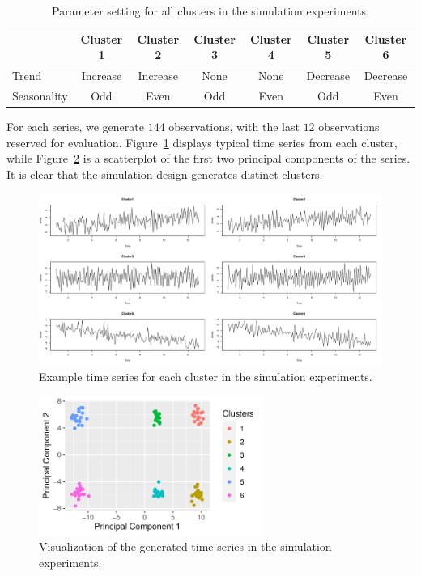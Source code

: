 \documentclass[a4paper,review,12pt,authoryear]{elsarticle}
\begin{document}
\begin{table}[h!]
\caption{\label{table:simu_params}Parameter setting for all clusters in the simulation experiments.}
\centering
\begin{tabular}{lcccccc}\toprule
& Cluster 1 & Cluster 2 & Cluster 3 & Cluster 4 & Cluster 5 & Cluster 6 \\ \midrule
Trend & Increase & Increase & None & None & Decrease & Decrease \\
Seasonality & Odd & Even & Odd & Even & Odd & Even  \\
    \bottomrule
\end{tabular}
\end{table}

For each series, we generate $144$ observations, with the last $12$ observations reserved for evaluation. Figure~\ref{fig:simu_emps} displays typical time series from each cluster, while Figure~\ref{fig:simu_pca} is a scatterplot of the first two principal components of the series. It is clear that the simulation design generates distinct clusters.

\begin{figure}[h!]
\centering
\includegraphics[width=\textwidth]{../manuscript/figures/simu_example.pdf}
\caption{\label{fig:simu_emps}Example time series for each cluster in the simulation experiments.}
\end{figure}

\begin{figure}[h!]
    \centering
    \includegraphics[width=0.65\textwidth]{../manuscript/figures/simu_pca.pdf}
    \caption{\label{fig:simu_pca}Visualization of the generated time series in the simulation experiments.}
\end{figure}
\end{document}
